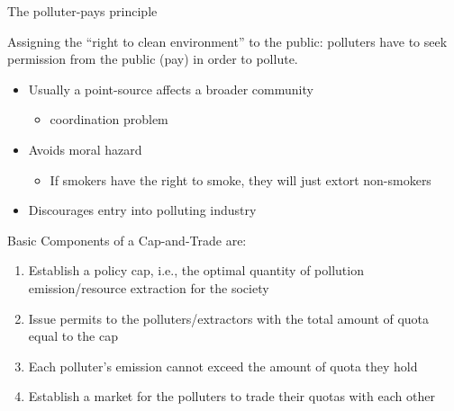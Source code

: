 \begin{frame}{The polluter-pays principle}
\protect\hypertarget{the-polluter-pays-principle}{}

Assigning the ``right to clean environment'' to the public: polluters
have to seek permission from the public (pay) in order to pollute.

\begin{itemize}
\tightlist
\item
  Usually a point-source affects a broader community

  \begin{itemize}
  \tightlist
  \item
    coordination problem\\
  \end{itemize}
\item
  Avoids moral hazard

  \begin{itemize}
  \tightlist
  \item
    If smokers have the right to smoke, they will just extort
    non-smokers
  \end{itemize}
\item
  Discourages entry into polluting industry
\end{itemize}

\end{frame}

\begin{frame}{Basic Components of a Cap-and-Trade are:}
\protect\hypertarget{basic-components-of-a-cap-and-trade-are}{}

\begin{enumerate}
\tightlist
\item
  Establish a policy cap, i.e., the optimal quantity of pollution
  emission/resource extraction for the society
\item
  Issue permits to the polluters/extractors with the total amount of
  quota equal to the cap
\item
  Each polluter's emission cannot exceed the amount of quota they hold
\item
  Establish a market for the polluters to trade their quotas with each
  other
\end{enumerate}

\end{frame}

